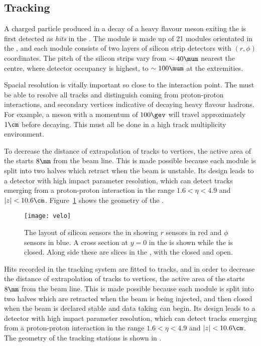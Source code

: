 \subsection{Tracking}

A charged particle produced in a decay of a heavy flavour meson exiting the \pv is first detected
as \emph{hits} in the \velo.
The \velo module is made up of 21 modules orientated in the , and
each module consists of two layers of silicon strip detectors with $(r,\phi)$ coordinates.
The pitch of the silicon strips vary from $\sim40\mum$ nearest the centre, where detector occupancy
is highest, to $\sim100\mum$ at the extremities.

Spacial resolution is vitally important so close to the interaction point.
The \velo must be able to resolve all tracks and distinguish  coming from
proton-proton interactions, and secondary vertices indicative of decaying heavy flavour hadrons.
For example, a \Bp meson with a momentum of $100\gev$ will travel approximately $1\cm$ before decaying.
This must all be done in a high track multiplicity environment.


To decrease the distance of extrapolation of tracks to vertices,
the active area of the \velo starts $8\mm$ from the beam line.
This is made possible because each module is split into two halves which retract when the \lhc beam
is unstable.
Its design leads to a detector with high impact parameter resolution, which can detect tracks
emerging from a proton-proton interaction in the range $1.6<\eta<4.9$ and $|z|<10.6\cm$.
Figure~\ref{fig:lhcb:velo} shows the geometry of the \velo.

\begin{figure}
  \begin{center}
    \texttt{[image: velo]}
  \end{center}
  \caption[LHCb Vertex Locator]
  {\small
    The layout of silicon sensors the \velo in showing $r$ sensors in red and $\phi$ sensors in
    blue.
    A cross section at $y=0$ in the  is shown while the \velo is closed.
    Along side these are slices in the , with the \velo closed and open.
  }
  \label{fig:lhcb:velo}
\end{figure}

Hits recorded in the tracking system are fitted to tracks, and in order to decrease the
distance of extrapolation of tracks to vertices,
the active area of the \velo starts $8\mm$ from the beam line.
This is made possible because each module is split into two halves which are retracted when the
\lhc beam is being injected, and then closed when the beam is declared stable and data taking can
begin.
Its design leads to a detector with high impact parameter resolution, which can detect tracks
emerging from a proton-proton interaction in the range $1.6<\eta<4.9$ and $|z|<10.6\cm$.
The geometry of the tracking stations is shown in .

